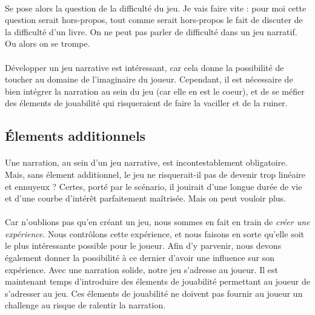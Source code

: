 \documentclass{report}
\begin{document}
\paragraph{}
Se pose alors la question de la difficulté du jeu. Je vais faire vite : pour moi cette question serait hors-propos, tout comme serait hors-propos le fait de discuter de la difficulté d'un livre. On ne peut pas parler de difficulté dans un jeu narratif. Ou alors on se trompe.

\paragraph{}
Développer un jeu narrative est intéressant, car cela donne la possibilité de toucher au domaine de l'imaginaire du joueur. Cependant, il est nécessaire de bien intégrer la narration au sein du jeu (car elle en est le coeur), et de se méfier des élements de jouabilité qui risqueraient de faire la vaciller et de la ruiner.

\subsection{Élements additionnels}

\paragraph{}
Une narration, au sein d'un jeu narrative, est incontestablement obligatoire. Mais, sans élement additionnel, le jeu ne risquerait-il pas de devenir trop linéaire et ennuyeux ? Certes, porté par le scénario, il jouirait d'une longue durée de vie et d'une courbe d'intérêt parfaitement maîtrisée. Mais on peut vouloir plus.

\paragraph{}
Car n'oublions pas qu'en créant un jeu, nous sommes en fait en train de \textit{créer une expérience}. Nous contrôlons cette expérience, et nous faisons en sorte qu'elle soit le plus intéressante possible pour le joueur. Afin d'y parvenir, nous devons également donner la possibilité à ce dernier d'avoir une influence sur son expérience. Avec une narration solide, notre jeu s'adresse au joueur. Il est maintenant temps d'introduire des élements de jouabilité permettant au joueur de s'adresser au jeu. Ces élements de jouabilité ne doivent pas fournir au joueur un challenge au risque de ralentir la narration.
\end{document}
